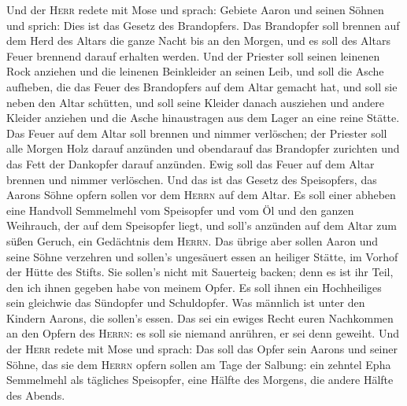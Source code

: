  Und der \textsc{Herr} redete mit Mose und sprach:
 Gebiete Aaron und seinen Söhnen und sprich: Dies ist das
Gesetz des Brandopfers. Das Brandopfer soll brennen auf dem Herd des
Altars die ganze Nacht bis an den Morgen, und es soll des Altars Feuer
brennend darauf erhalten werden.  Und der Priester soll
seinen leinenen Rock anziehen und die leinenen Beinkleider an seinen
Leib, und soll die Asche aufheben, die das Feuer des Brandopfers auf dem
Altar gemacht hat, und soll sie neben den Altar schütten, 
und soll seine Kleider danach ausziehen und andere Kleider anziehen und
die Asche hinaustragen aus dem Lager an eine reine Stätte.
 Das Feuer auf dem Altar soll brennen und nimmer
verlöschen; der Priester soll alle Morgen Holz darauf anzünden und
obendarauf das Brandopfer zurichten und das Fett der Dankopfer darauf
anzünden.  Ewig soll das Feuer auf dem Altar brennen und
nimmer verlöschen.  Und das ist das Gesetz des
Speisopfers, das Aarons Söhne opfern sollen vor dem \textsc{Herrn} auf
dem Altar.  Es soll einer abheben eine Handvoll Semmelmehl
vom Speisopfer und vom Öl und den ganzen Weihrauch, der auf dem
Speisopfer liegt, und soll's anzünden auf dem Altar zum süßen Geruch,
ein Gedächtnis dem \textsc{Herrn}.  Das übrige aber sollen
Aaron und seine Söhne verzehren und sollen's ungesäuert essen an
heiliger Stätte, im Vorhof der Hütte des Stifts.  Sie
sollen's nicht mit Sauerteig backen; denn es ist ihr Teil, den ich ihnen
gegeben habe von meinem Opfer. Es soll ihnen ein Hochheiliges sein
gleichwie das Sündopfer und Schuldopfer.  Was männlich
ist unter den Kindern Aarons, die sollen's essen. Das sei ein ewiges
Recht euren Nachkommen an den Opfern des \textsc{Herrn}: es soll sie
niemand anrühren, er sei denn geweiht.  Und der
\textsc{Herr} redete mit Mose und sprach:  Das soll das
Opfer sein Aarons und seiner Söhne, das sie dem \textsc{Herrn} opfern
sollen am Tage der Salbung: ein zehntel Epha Semmelmehl als tägliches
Speisopfer, eine Hälfte des Morgens, die andere Hälfte des Abends.

